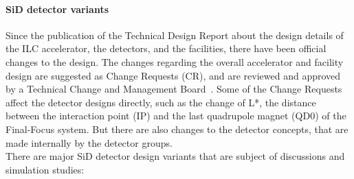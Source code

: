 \paragraph{SiD detector variants}
Since the publication of the Technical Design Report about the design details of the ILC accelerator, the detectors, and the facilities, there have been official changes to the design.
The changes regarding the overall accelerator and facility design are suggested as Change Requests (CR), and are reviewed and approved by a Technical Change and Management Board~\cite{TCMB}. 
Some of the Change Requests affect the detector designs directly, such as the change of L*, the distance between the interaction point (IP) and the last quadrupole magnet (QD0) of the Final-Focus system.
But there are also changes to the detector concepts, that are made internally by the detector groups.\\
There are major SiD detector design variants that are subject of discussions and simulation studies:
